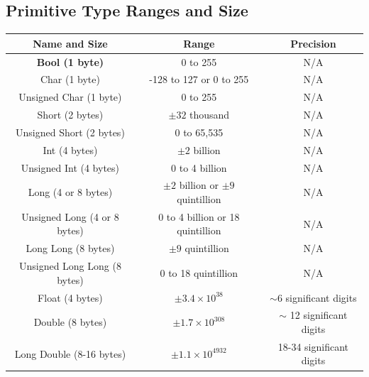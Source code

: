\documentclass{report}
\begin{document}
%     
%     
%     
%     
    \bigbreak \noindent 
    \subsection{Primitive Type Ranges and Size}
    \bigbreak \noindent 
    \begin{tabular}{|c|c|c|}
        \hline
        \textbf{Name and Size} & \textbf{Range} & \textbf{Precision} \\
        \hline
        \textbf{Bool (1 byte)} & 0 to 255 & N/A \\
        \hline
        Char (1 byte) & -128 to 127 or 0 to 255 & N/A \\
        \hline
        Unsigned Char (1 byte) & 0 to 255 & N/A \\
        \hline
        Short (2 bytes) & \(\pm 32\) thousand & N/A \\
        \hline
        Unsigned Short (2 bytes) & 0 to 65,535 & N/A \\
        \hline
        Int (4 bytes) & \(\pm 2\) billion & N/A \\
        \hline
        Unsigned Int (4 bytes) & 0 to 4 billion & N/A \\
        \hline
        Long (4 or 8 bytes) & \(\pm 2\) billion or \(\pm 9\) quintillion & N/A \\
        \hline
        Unsigned Long (4 or 8 bytes) & 0 to 4 billion or 18 quintillion & N/A \\
        \hline
        Long Long (8 bytes) & \(\pm 9\) quintillion & N/A \\
        \hline
        Unsigned Long Long (8 bytes) & 0 to 18 quintillion & N/A \\
        \hline
        Float (4 bytes) & \(\pm 3.4 \times 10^{38}\)  & $\sim 6$ significant digits \\
        \hline
        Double (8 bytes) & \(\pm 1.7 \times 10^{308}\)  & $\sim$ 12 significant digits \\
        \hline
        Long Double (8-16 bytes) & \(\pm 1.1 \times 10^{4932}\)  & 18-34 significant digits \\
        \hline
    \end{tabular}
\end{document}
